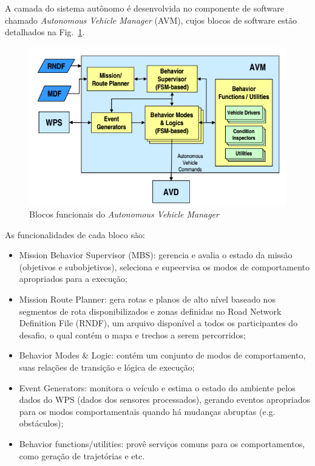 A camada do sistema autônomo é desenvolvida no componente de software chamado
\textit{Autonomous Vehicle Manager} (AVM), cujos blocos de software estão
detalhados na Fig.~\ref{fig:avm}. 

\begin{figure}[!ht]
\centering
\includegraphics[width=\columnwidth]{figs/AVM}
\caption{Blocos funcionais do \textit{Autonomous Vehicle Manager}}
\label{fig:avm}
\end{figure}

As funcionalidades de cada bloco são:

\begin{itemize}
  \item Mission Behavior Supervisor (MBS): gerencia e avalia o estado
  da missão (objetivos e subobjetivos), seleciona e supeervisa os modos de comportamento apropriados
  para a execução;
  \item Mission Route Planner: gera rotas e planos de alto nível baseado nos
  segmentos de rota disponibilizados e zonas definidas no Road Network
  Definition File (RNDF), um arquivo disponível a todos os participantes do
  desafio, o qual contém o mapa e trechos a serem percorridos;
  \item Behavior Modes \& Logic: contém um conjunto de modos de comportamento,
  suas relações de transição e lógica de execução;
  \item Event Generators: monitora o veículo e estima o estado do ambiente pelos
  dados do WPS (dados dos sensores processados), gerando eventos apropriados
  para os modos comportamentais quando há mudanças abruptas (e.g. obstáculos);
  \item Behavior functions/utilities: provê serviços comuns para os
  comportamentos, como geração de trajetórias e etc.
\end{itemize}

